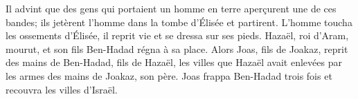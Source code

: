 Il advint que des gens qui portaient un homme en terre aperçurent une de ces bandes;
	ils jetèrent l’homme dans la tombe d’Élisée et partirent.
L’homme toucha les ossements d’Élisée, il reprit vie et se dressa sur ses pieds.
Hazaël, roi d’Aram, mourut, et son fils Ben-Hadad régna à sa place.
Alors Joas, fils de Joakaz, reprit des mains de Ben-Hadad, fils de Hazaël,
	les villes que Hazaël avait enlevées par les armes des mains de Joakaz, son père.
Joas frappa Ben-Hadad trois fois et recouvra les villes d’Israël.
